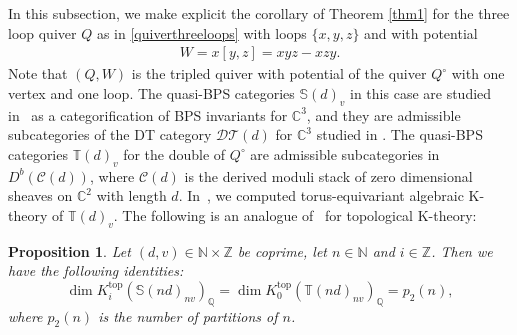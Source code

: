 \documentclass [11pt,oneside,a4paper,mathscr]{amsart}
\newtheorem{prop}[thm]{Proposition}
\theoremstyle{definition}
\begin{document}
In this subsection, we make explicit the corollary of Theorem \ref{thm1} for the three loop quiver $Q$ as in \eqref{quiverthreeloops} with loops $\{x,y,z\}$ and with potential \begin{align*}W=x[y,z]=xyz-xzy.\end{align*}
Note that $(Q, W)$ is the tripled quiver 
with potential of the quiver $Q^{\circ}$ with one 
vertex and one loop. 
The quasi-BPS categories $\mathbb{S}(d)_v$ 
in this case are studied in~\cite{PTzero}
as a categorification of BPS invariants 
for $\mathbb{C}^3$, 
and they are admissible 
subcategories 
of the DT category $\mathcal{DT}(d)$
for $\mathbb{C}^3$ studied in \cite{PTzero}. The quasi-BPS categories $\mathbb{T}(d)_v$
for the double of $Q^{\circ}$ are admissible
subcategories 
in $D^b(\mathscr{C}(d))$, where $\mathscr{C}(d)$ is the 
derived moduli stack of zero dimensional 
sheaves on $\mathbb{C}^2$ with length $d$. 
In~\cite[Theorem~4.13]{PTzero}, we 
computed torus-equivariant algebraic K-theory of 
$\mathbb{T}(d)_v$. 
The following is an analogue of~\cite[Theorem~4.13]{PTzero}
for topological K-theory: 

\begin{prop}\label{prop89}
Let $(d,v)\in \mathbb{N}\times\mathbb{Z}$ be coprime, let $n\in\mathbb{N}$ and $i\in \mathbb{Z}$. 
Then we have the following identities: 
\[\dim K^{\mathrm{top}}_i(\mathbb{S}(nd)_{nv})_{\mathbb{Q}}=\dim K^{\mathrm{top}}_0(\mathbb{T}(nd)_{nv})_{\mathbb{Q}}=p_2(n),\]
where $p_2(n)$ is the number of partitions of $n$.
\end{prop}
\end{document}

